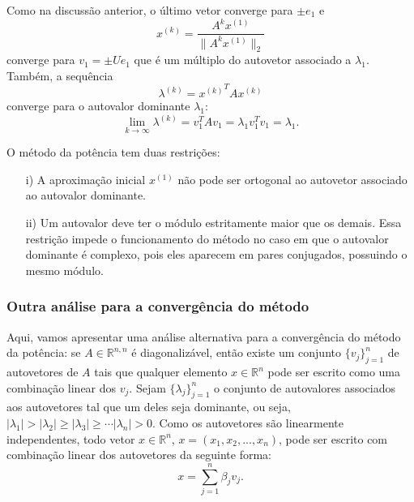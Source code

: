 Como na discussão anterior, o último vetor converge para $\pm e_1$ e
\begin{equation}
  x^{(k)} = \frac{A^kx^{(1)}}{\|A^kx^{(1)}\|_2}
\end{equation}
converge para $v_1=\pm Ue_1$ que é um múltiplo do autovetor associado a $\lambda_1$. Também, a sequência
\begin{equation}
  \lambda^{(k)} = {x^{(k)}}^TAx^{(k)}
\end{equation}
converge para o autovalor dominante $\lambda_1$:
\begin{equation}
  \lim_{k\to\infty}\lambda^{(k)} =  v_1^TA v_1 = \lambda_1v_1^Tv_1=\lambda_1.
\end{equation}

\begin{obs}
O método da potência tem duas restrições:
\begin{itemize}
 \item[i)] A aproximação inicial $x^{(1)}$ não pode ser ortogonal ao autovetor associado ao autovalor dominante.
 \item[ii)] Um autovalor deve ter o módulo estritamente maior que os demais. Essa restrição impede o funcionamento do método no caso em que o autovalor dominante é complexo, pois eles aparecem em pares conjugados, possuindo o mesmo módulo.
\end{itemize}
\end{obs}

\subsubsection{Outra análise para a convergência do método}

Aqui, vamos apresentar uma análise alternativa para a convergência do método da potência: se $A\in \mathbb{R}^{n,n}$ é diagonalizável, então existe um conjunto $\{v_{j}\}_{j=1}^n$ de autovetores de $A$ tais que qualquer elemento $x\in\mathbb{R}^n$ pode ser escrito como uma combinação linear dos $v_{j}$. Sejam $\{\lambda_j\}_{j=1}^n$ o conjunto de autovalores associados aos autovetores tal que um deles seja dominante, ou seja, $|\lambda_1|>|\lambda_2|\geq |\lambda_3|\geq\cdots |\lambda_n|>0$. Como os autovetores são linearmente independentes, todo vetor $x\in\mathbb{R}^n$, $x=(x_1,x_2,...,x_n)$, pode ser escrito com combinação linear dos autovetores da seguinte forma:
\begin{equation}\label{eq:met_pot_forma}
x = \sum_{j=1}^n \beta_jv_{j}.
\end{equation}

